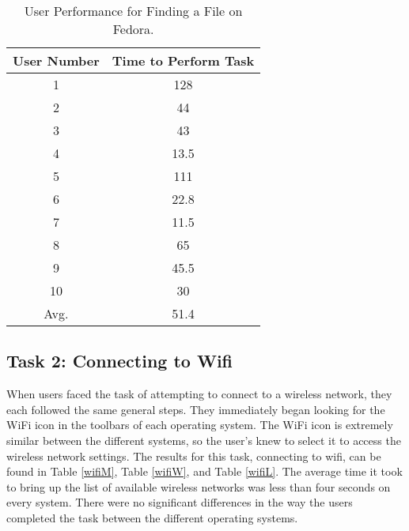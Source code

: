 \documentclass[11pt,letterpaper]{report}
\begin{document}
\begin{table}
    \centering
    \begin{tabular}{| c | c |}
        \hline
        User Number & Time to Perform Task \\ \hline
        1 & 128 \\  \hline
        2 & 44 \\  \hline
        3 & 43 \\ \hline
        4 & 13.5 \\  \hline
        5 & 111 \\    \hline
        6 & 22.8 \\  \hline
        7 & 11.5 \\ \hline
        8 & 65 \\  \hline
        9 & 45.5 \\ \hline
        10 & 30 \\ \hline
        Avg. & 51.4 \\
        \hline
    \end{tabular}
    \caption{User Performance for Finding a File on Fedora.}
    \label{fafL}    
\end{table}

\subsection{Task 2: Connecting to Wifi}

When users faced the task of attempting to connect to a wireless network, they each followed the same general steps. They immediately began looking for the WiFi icon in the toolbars of each operating system. The WiFi icon is extremely similar between the different systems, so the user's knew to select it to access the wireless network settings. The results for this task, connecting to wifi, can be found in Table \ref{wifiM}, Table \ref{wifiW}, and Table \ref{wifiL}. The average time it took to bring up the list of available wireless networks was less than four seconds on every system. There were no significant differences in the way the users completed the task between the different operating systems.
\end{document}
